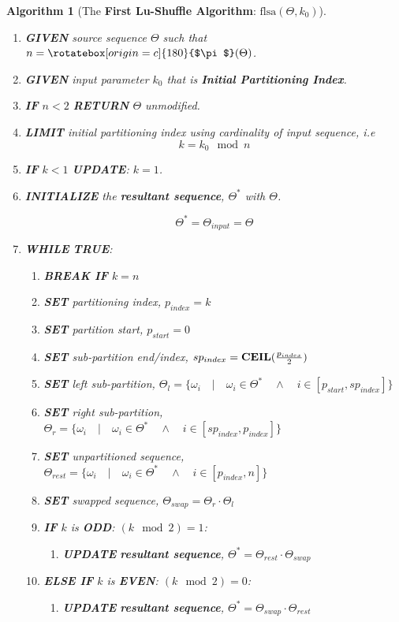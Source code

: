 \documentclass[a4paper, 18pt]{book} %
\newtheorem{alg}{Algorithm}
\newcommand{\invpi}{\rotatebox[origin=c]{180}{$\pi$}}
\begin{document}
\begin{alg}[The \textbf{First Lu-Shuffle Algorithm}: $\text{flsa}(\Theta, k_0)$]
\label{ALGLUSHUFFLEA}
$ $\\
\begin{enumerate}
\item \textbf{GIVEN} source sequence $\Theta$ such that $n = \invpi(\Theta)$.
\item  \textbf{GIVEN} input parameter $k_0$ that is \textbf{Initial Partitioning Index}.
\item \textbf{IF} $n < 2$ \textbf{RETURN} $\Theta$ unmodified.
\item {\textbf{LIMIT} initial partitioning index using cardinality of input sequence, i.e
\begin{equation}
k = k_0 \mod n
\end{equation}
}
\item \textbf{IF} $k < 1$ \textbf{UPDATE}: $k = 1$.
\item{  \textbf{INITIALIZE} the \textbf{resultant sequence}, $\Theta^*$ with $\Theta$.

		\begin{equation}
		\Theta^* = \Theta_{input} = \Theta
		\end{equation}
}
\item { \textbf{WHILE} \textbf{TRUE}:
\begin{enumerate}
	\item \textbf{BREAK IF} $k = n$
	\item \textbf{SET} partitioning index, $p_{index} = k$
	\item \textbf{SET} partition start, $p_{start} = 0$
	\item \textbf{SET} sub-partition end/index, $sp_{index} = \text{\textbf{CEIL}}(\frac{p_{index}}{2})$
	\item \textbf{SET} left sub-partition, $\Theta_{l} = \{\omega_i \quad|\quad \omega_i \in \Theta^* \quad \land \quad i \in [p_{start},sp_{index}]\}$
	\item \textbf{SET} right sub-partition, $\Theta_{r} = \{\omega_i \quad|\quad \omega_i \in \Theta^* \quad \land \quad i \in [sp_{index},p_{index}]\}$
	\item \textbf{SET} unpartitioned sequence, $\Theta_{rest} = \{\omega_i \quad|\quad \omega_i \in \Theta^* \quad \land \quad i \in [p_{index},n]\}$
	\item \textbf{SET} swapped sequence, $\Theta_{swap} = \Theta_{r} \cdot \Theta_{l}$ 
	
	\item{\textbf{IF} $k$ is \textbf{ODD}: $(k \mod 2) = 1$:
		\begin{enumerate}
			\item \textbf{UPDATE} \textbf{resultant sequence}, $\Theta^* = \Theta_{rest} \cdot \Theta_{swap}$
		\end{enumerate}
	}
	\item{\textbf{ELSE IF} $k$ is \textbf{EVEN}: $(k \mod 2) = 0$:
		\begin{enumerate}
		\item \textbf{UPDATE} \textbf{resultant sequence}, $\Theta^* = \Theta_{swap} \cdot \Theta_{rest}$
		\end{enumerate}
	}
	

\end{enumerate}}
\end{enumerate}
\end{alg}
\end{document}
